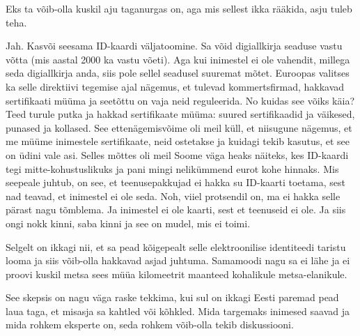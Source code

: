 
Eks ta võib-olla kuskil aju taganurgas on, aga mis sellest ikka rääkida, asju 
tuleb teha. 


Jah. Kasvõi seesama ID-kaardi väljatoomine.  Sa võid digiallkirja seaduse vastu 
võtta (mis aastal 2000 ka vastu võeti). Aga  kui inimestel ei ole vahendit, 
millega seda digiallkirja anda, siis pole sellel seadusel suuremat mõtet. 
Euroopas valitses ka selle direktiivi tegemise ajal nägemus, et  tulevad 
kommertsfirmad, hakkavad  sertifikaati müüma ja seetõttu on vaja neid 
reguleerida. No kuidas see võiks käia? Teed turule putka ja hakkad sertifikaate 
müüma: suured sertifikaadid ja väikesed, punased ja kollased. See 
ettenägemisvõime oli meil küll, et niisugune nägemus, et me müüme inimestele 
sertifikaate, neid ostetakse ja kuidagi tekib kasutus, et see on üdini vale 
asi. Selles mõttes oli meil Soome väga heaks näiteks, kes ID-kaardi tegi 
mitte-kohustuslikuks ja pani mingi nelikümmend eurot kohe  hinnaks. Mis 
seepeale juhtub, on see, et teenusepakkujad ei hakka su ID-kaarti toetama, sest 
nad teavad, et inimestel ei ole seda. Noh, viiel protsendil on, ma ei hakka 
selle pärast nagu tõmblema.  Ja inimestel ei ole kaarti, sest  et teenuseid ei 
ole. Ja siis ongi nokk kinni, saba kinni ja see on mudel, mis ei toimi. 

Selgelt on ikkagi nii, et sa pead kõigepealt selle  elektroonilise identiteedi 
taristu looma ja siis võib-olla hakkavad asjad juhtuma.  Samamoodi nagu sa ei 
lähe ja ei proovi kuskil metsa sees müüa kilomeetrit maanteed  kohalikule 
metsa-elanikule. 


See skepsis on nagu väga raske tekkima, kui sul on ikkagi Eesti paremad pead 
laua taga, et misasja sa kahtled või kõhkled. Mida targemaks inimesed saavad ja 
mida rohkem eksperte on, seda rohkem võib-olla tekib diskussiooni. 


